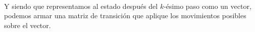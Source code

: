 \documentclass[../main.tex]{subfiles}
\begin{document}
\begin{figure}[H]
  \centering
\end{figure}

\paragraph{} Y siendo que representamos al estado después del \(k\)-ésimo paso como un vector, podemos armar una matriz de transición que aplique los movimientos posibles sobre el vector.
\end{document}
